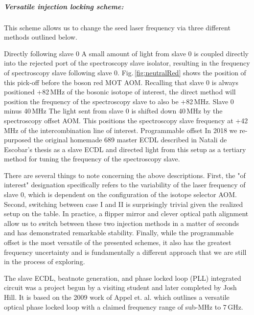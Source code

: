 \subparagraph{Versatile injection locking scheme:}
This scheme allows us to change the seed laser frequency via three different methods outlined below.
\begin{outline}[enumerate]
	\1 Directly following slave 0
		\2 A small amount of light from slave 0 is coupled directly into the rejected port of the spectroscopy slave isolator, resulting in the frequency of spectroscopy slave following slave 0. 
		Fig.\,\ref{fig:neutralRed} shows the position of this pick-off before the boson red MOT AOM. 
		Recalling that slave 0 is always positioned +82\,MHz of the bosonic isotope of interest, the direct method will position the frequency of the spectroscopy slave to also be +82\,MHz.
	\1 Slave 0 minus 40\,MHz
		\2 The light sent from slave 0 is shifted down 40\,MHz by the spectroscopy offset AOM. This positions the spectroscopy slave frequency at +42\,MHz of the intercombination line of interest.
	\1 Programmable offset
		\2 In 2018 we re-purposed the original homemade 689 master ECDL described in Natali de Escobar's thesis as a slave ECDL and directed light from this setup as a tertiary method for tuning the frequency of the spectroscopy slave. 
\end{outline}
There are several things to note concerning the above descriptions.
First, the "of interest" designation specifically refers to the variability of the laser frequency of slave 0, which is dependent on the configuration of the isotope selector AOM. 
Second, switching between case I and II is surprisingly trivial given the realized setup on the table.
In practice, a flipper mirror and clever optical path alignment allow us to switch between these two injection methods in a matter of seconds and has demonstrated remarkable stability.
Finally, while the programmable offset is the most versatile of the presented schemes, it also has the greatest frequency uncertainty and is fundamentally a different approach that we are still in the process of exploring.

The slave ECDL, beatnote generation, and phase locked loop (PLL) integrated circuit was a project begun by a visiting student and later completed by Josh Hill.
It is based on the 2009 work of Appel et. al. \cite{zfr08expansion} which outlines a versatile optical phase locked loop with a claimed frequency range of sub-MHz to 7\,GHz.

